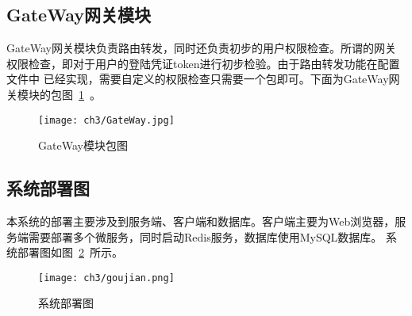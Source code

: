 \subsection{GateWay网关模块}
GateWay网关模块负责路由转发，同时还负责初步的用户权限检查。所谓的网关权限检查，即对于用户的登陆凭证token进行初步检验。由于路由转发功能在配置文件中
已经实现，需要自定义的权限检查只需要一个包即可。下面为GateWay网关模块的包图~\ref{fig:GateWay}~。
\begin{figure}[htbp]
    \centering
    \texttt{[image: ch3/GateWay.jpg]}
    \caption{GateWay模块包图}\label{fig:GateWay}
    \vspace{\baselineskip} %
\end{figure}

\subsection{系统部署图}
本系统的部署主要涉及到服务端、客户端和数据库。客户端主要为Web浏览器，服务端需要部署多个微服务，同时启动Redis服务，数据库使用MySQL数据库。
系统部署图如图~\ref{fig:goujian}~所示。
\begin{figure}[htbp]
    \centering
    \texttt{[image: ch3/goujian.png]}
    \caption{系统部署图}\label{fig:goujian}
    \vspace{\baselineskip} %
\end{figure}